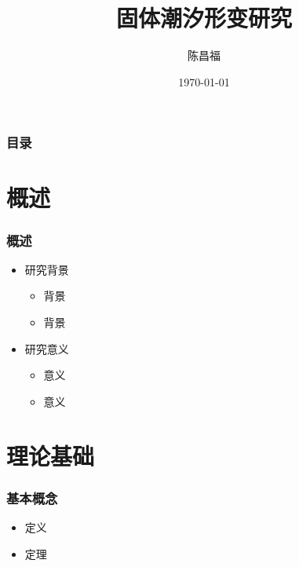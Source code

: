 \documentclass[12pt]{ctexbeamer}	%
\title{固体潮汐形变研究}	%
\author[陈昌福]{陈昌福}
\institute[西南交通大学]{
大地测量学实验室\\
西南交通大学，测绘遥感信息系
}   %
\date{\today}
\begin{document}
\begin{frame}
    \titlepage
\end{frame}


\begin{frame}
    \frametitle{目录}
    \tableofcontents
\end{frame}


\section{概述}

\begin{frame}
    \frametitle{概述}
    \begin{itemize}
        \item<1-> 研究背景
        \begin{itemize}
            \item<1-> 背景
            \item<1-> 背景
        \end{itemize}
        \item<2-> 研究意义
        \begin{itemize}
            \item<2-> 意义
            \item<2-> 意义
        \end{itemize}
    \end{itemize}
\end{frame}


\section{理论基础}

\begin{frame}
    \frametitle{基本概念}
    \begin{itemize}
        \item<1-> 定义
        \item<2-> \alert{定理}
    \end{itemize}
\end{frame}

\end{document}
